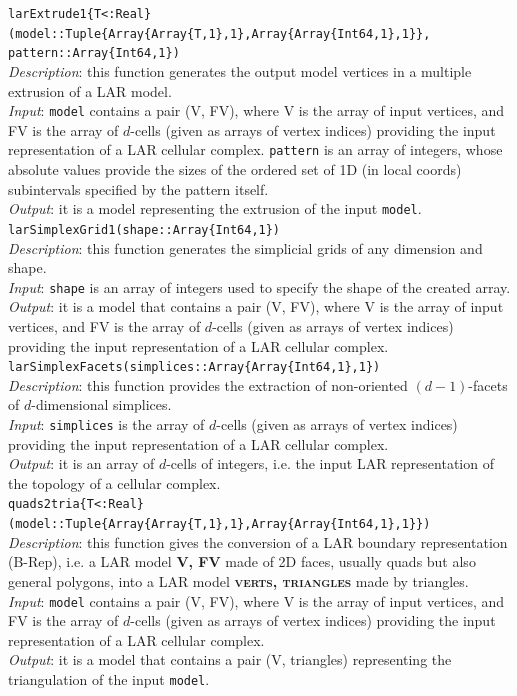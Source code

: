 \documentclass[a4paper,12pt,titlepage]{article}					%
\begin{document}
\texttt{larExtrude1\{T<:Real\}(model::Tuple\{Array\{Array\{T,1\},1\},Array\{Array\{Int64,1\},1\}\},\\pattern::Array\{Int64,1\})}
\\
\emph{Description}: this function generates the output model vertices in a multiple extrusion of a LAR model.
\\
\emph{Input}: \texttt{model} contains a pair (V, FV), where V is the array of input vertices, and FV is the array of $d$-cells (given as arrays of vertex indices) providing the input representation of a LAR cellular complex.
\texttt{pattern} is an array of integers, whose absolute values provide the sizes of the ordered set of 1D (in local coords) subintervals specified by the pattern itself.
\\
\emph{Output}: it is a model representing the extrusion of the input \texttt{model}.
\\

\texttt{larSimplexGrid1(shape::Array\{Int64,1\})}
\\
\emph{Description}: this function generates the simplicial grids of any dimension and shape.
\\
\emph{Input}: \texttt{shape} is an array of integers used to specify the shape of the created array.
\\
\emph{Output}: it is a model that contains a pair (V, FV), where V is the array of input vertices, and FV is the array of $d$-cells (given as arrays of vertex indices) providing the input representation of a LAR cellular complex.
\\

\texttt{larSimplexFacets(simplices::Array\{Array\{Int64,1\},1\})}
\\
\emph{Description}: this function provides the extraction of non-oriented $(d-1)$-facets of $d$-dimensional simplices.
\\
\emph{Input}: \texttt{simplices} is the array of $d$-cells (given as arrays of vertex indices) providing the input representation of a LAR cellular complex.
\\
\emph{Output}: it is an array of $d$-cells of integers, i.e. the input LAR representation of the topology of a cellular complex.
\\

\texttt{quads2tria\{T<:Real\}(model::Tuple\{Array\{Array\{T,1\},1\},Array\{Array\{Int64,1\},1\}\})}
\\
\emph{Description}: this function gives the conversion of a LAR boundary representation (B-Rep), i.e. a LAR model \textbf{\textsc{V, FV}} made of 2D faces, usually quads but also general polygons, into a LAR model \textbf{\textsc{verts, triangles}} made by triangles.
\\
\emph{Input}: \texttt{model} contains a pair (V, FV), where V is the array of input vertices, and FV is the array of $d$-cells (given as arrays of vertex indices) providing the input representation of a LAR cellular complex.
\\
\emph{Output}: it is a model that contains a pair (V, triangles) representing the triangulation of the input \texttt{model}.
\end{document}
